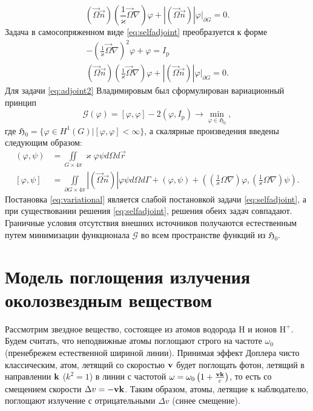 \begin{equation}
(\vec \Omega \vec n)\left(\frac{1}{\varkappa}\vec \Omega\nabla\right)\varphi + |(\vec \Omega \vec n)|\varphi\Big|_{\partial G} = 0.
\label{eq:bcuniform}
\end{equation}
Задача в самосопряженном виде \eqref{eq:selfadjoint} преобразуется к форме
\begin{equation}
\begin{gathered}
-\left(\frac{1}{\varkappa}\vec \Omega \nabla\right)^2 \varphi + \varphi = I_\text{p}\\
(\vec \Omega \vec n)\left(\frac{1}{\varkappa}\vec \Omega\nabla\right)\varphi + |(\vec \Omega \vec n)|\varphi\Big|_{\partial G} = 0.
\label{eq:adjoint2}
\end{gathered}
\end{equation}
Для задачи \eqref{eq:adjoint2} Владимировым был сформулирован вариационный принцип \cite{vladimirov1961}
\begin{equation}
\mathcal{G}(\varphi) = [\varphi, \varphi] - 2(\varphi, I_\text{p}) \rightarrow \min_{\varphi \in \mathfrak{H}_0},
\label{eq:variational}
\end{equation}
где $\mathfrak{H}_0 = \Big\{\varphi \in H^{1}(G)\Big| [\varphi, \varphi] < \infty \Big\}$, а скалярные произведения введены следующим образом:
\[
\begin{aligned}
(\varphi,\psi) &= \iint\limits_{G \times 4\pi} \varkappa \varphi \psi d\Omega d\vec r\\
[\varphi,\psi] &= \iint\limits_{\partial G \times 4\pi} |(\vec \Omega \vec n)| \varphi \psi d\Omega d \Gamma + (\varphi, \psi) + 
\left(\left(\frac{1}{\varkappa}\Omega \nabla\right) \varphi, \left(\frac{1}{\varkappa}\Omega \nabla\right) \psi\right).
\end{aligned}
\]
Постановка \eqref{eq:variational} является слабой постановкой задачи \eqref{eq:selfadjoint}, а при существовании решения \eqref{eq:selfadjoint}, решения обеих задач совпадают. Граничные условия отсутствия внешних источников получаются естественным путем минимизации функционала $\mathcal{G}$ во всем пространстве функций из $\mathfrak{H}_0$.

\section{Модель поглощения излучения околозвездным веществом}
Рассмотрим звездное вещество, состоящее из атомов водорода H и ионов $\text{H}^+$. Будем считать, что неподвижные атомы поглощают строго на частоте $\omega_0$ (пренебрежем естественной шириной линии). Принимая эффект Доплера чисто классическим, атом, летящий со скоростью $\boldsymbol{\mathbf{v}}$ будет поглощать фотон, летящий в направлении $\boldsymbol{\mathbf{k}}$ ($k^2 = 1$) в линии с частотой $\omega = \omega_0\left(1 + \frac{\boldsymbol{\mathbf{v}}\boldsymbol{\mathbf{k}}}{c}\right)$, то есть со смещением скорости $\Delta v = -\boldsymbol{\mathbf{v}}\boldsymbol{\mathbf{k}}$. Таким образом, атомы, летящие к наблюдателю, поглощают излучение с отрицательными $\Delta v$ (синее смещение).

